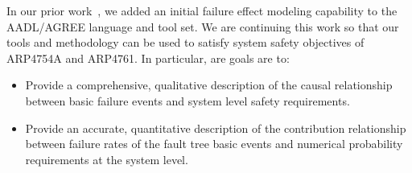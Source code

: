 
In our prior work~\cite{Stewart17:IMBSA}, we added an initial failure effect modeling capability to the AADL/AGREE language and tool set.  We are continuing this work so that our tools and methodology can be used to satisfy system safety objectives of ARP4754A and ARP4761.  In particular, are goals are to:

\begin{itemize}
	\item Provide a comprehensive, qualitative description of the causal relationship between basic failure events and system level safety requirements.
	\item Provide an accurate, quantitative description of the contribution relationship between failure rates of the fault tree basic events and numerical probability requirements at the system level.
\end{itemize}





